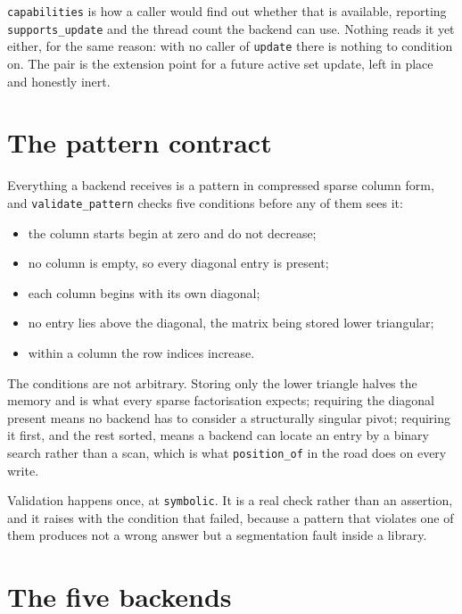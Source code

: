 \documentclass[a4paper,11pt]{book}
\theoremstyle{plain}
\theoremstyle{definition}
\theoremstyle{remark}
\numberwithin{equation}{chapter}
\numberwithin{algorithm}{chapter}
\begin{document}
	\texttt{capabilities} is how a caller would find out whether that is
	available, reporting \texttt{supports\_update} and the thread count the
	backend can use. Nothing reads it yet either, for the same reason: with no
	caller of \texttt{update} there is nothing to condition on. The pair is the
	extension point for a future active set update, left in place and honestly
	inert.

	\section{The pattern contract}

	Everything a backend receives is a pattern in compressed sparse column form,
	and \texttt{validate\_pattern} checks five conditions before any of them sees
	it:
	\begin{itemize}
		\item the column starts begin at zero and do not decrease;
		\item no column is empty, so every diagonal entry is present;
		\item each column begins with its own diagonal;
		\item no entry lies above the diagonal, the matrix being stored lower
		triangular;
		\item within a column the row indices increase.
	\end{itemize}

	The conditions are not arbitrary. Storing only the lower triangle halves the
	memory and is what every sparse factorisation expects; requiring the diagonal
	present means no backend has to consider a structurally singular pivot;
	requiring it first, and the rest sorted, means a backend can locate an entry
	by a binary search rather than a scan, which is what \texttt{position\_of} in
	the road does on every write.

	Validation happens once, at \texttt{symbolic}. It is a real check rather than
	an assertion, and it raises with the condition that failed, because a pattern
	that violates one of them produces not a wrong answer but a segmentation
	fault inside a library.

	\section{The five backends}
\end{document}
